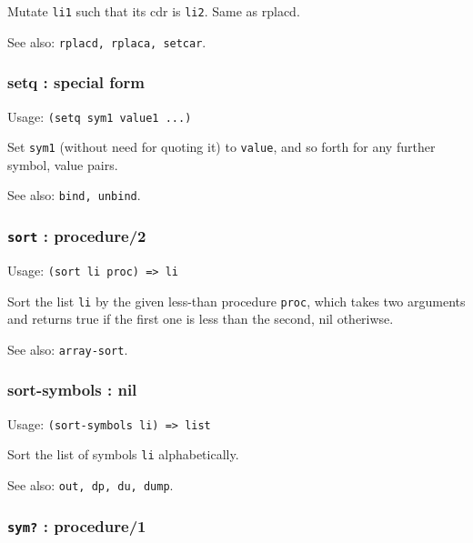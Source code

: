 \documentclass[
]{article}
\newcommand{\passthrough}[1]{#1}
\begin{document}
Mutate \passthrough{\lstinline!li1!} such that its cdr is
\passthrough{\lstinline!li2!}. Same as rplacd.

See also: \passthrough{\lstinline!rplacd, rplaca, setcar!}.

\hypertarget{setq-special-form}{%
\subsubsection{setq : special form}\label{setq-special-form}}

Usage: \passthrough{\lstinline!(setq sym1 value1 ...)!}

Set \passthrough{\lstinline!sym1!} (without need for quoting it) to
\passthrough{\lstinline!value!}, and so forth for any further symbol,
value pairs.

See also: \passthrough{\lstinline!bind, unbind!}.

\hypertarget{sort-procedure2}{%
\subsubsection{\texorpdfstring{\texttt{sort} :
procedure/2}{sort : procedure/2}}\label{sort-procedure2}}

Usage: \passthrough{\lstinline!(sort li proc) => li!}

Sort the list \passthrough{\lstinline!li!} by the given less-than
procedure \passthrough{\lstinline!proc!}, which takes two arguments and
returns true if the first one is less than the second, nil otheriwse.

See also: \passthrough{\lstinline!array-sort!}.

\hypertarget{sort-symbols-nil}{%
\subsubsection{sort-symbols : nil}\label{sort-symbols-nil}}

Usage: \passthrough{\lstinline!(sort-symbols li) => list!}

Sort the list of symbols \passthrough{\lstinline!li!} alphabetically.

See also: \passthrough{\lstinline!out, dp, du, dump!}.

\hypertarget{sym-procedure1}{%
\subsubsection{\texorpdfstring{\texttt{sym?} :
procedure/1}{sym? : procedure/1}}\label{sym-procedure1}}
\end{document}
